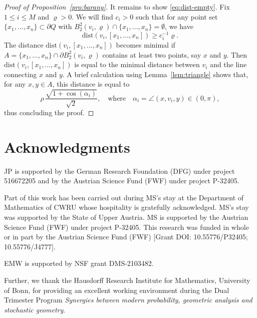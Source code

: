 \documentclass[a4paper,12pt]{article}
\theoremstyle{definition}
\newcommand{\dist}{\mathrm{dist}}
\begin{document}
\begin{proof}[Proof of Proposition~\ref{pro:barany}]
It remains to show \eqref{eq:dist-empty}. Fix $1\le i\le M$ and $\varrho>0$. We will find $c_i>0$ such that for any point set $\{x_1,\dots,x_n\}\subset \partial Q$ with $B^2_2(v_i,\varrho)\cap \{x_1,\dots,x_n\}=\emptyset$, we have 
\[
\dist(v_i,[x_1,\dots,x_n])\ge c_i^{-1}\varrho.
\]
The distance $\dist(v_i,[x_1,\dots,x_n])$ becomes minimal if $A=\{x_1,\dots,x_n\}\cap \partial B^2_2(v_i,\varrho)$ contains at least two points, say $x$ and $y$. Then $\dist(v_i,[x_1,\dots,x_n])$ is equal to the minimal distance between $v_i$ and the line connecting $x$ and $y$. A brief calculation using Lemma~\ref{lem:triangle} shows that, for any $x,y\in A$, this distance is equal to 
\begin{equation} \label{eq:height-2}
	\rho \, \frac{\sqrt{1+\cos(\alpha_i)}}{\sqrt{2}},\quad\text{where}\quad\alpha_i=\angle(x,v_i,y)\in (0,\pi),
\end{equation}
thus concluding the proof.
\end{proof}




\section*{Acknowledgments}

JP is supported by the German Research Foundation (DFG) under project 516672205 and by the Austrian Science Fund (FWF) under project P-32405.

\par
\noindent
Part of this work has been carried out during MS's stay at the Department of Mathematics of CWRU whose hospitality is gratefully acknowledged.  MS's stay was supported by the State of Upper Austria.  MS is supported by the Austrian Science Fund (FWF) under project P-32405. This research was funded in whole or in part by the Austrian Science Fund (FWF) [Grant DOI: 10.55776/P32405; 10.55776/J4777]. 
\par
\noindent
EMW is  supported by NSF grant DMS-2103482.
\par
\noindent
Further, we thank the Hausdorff Research Institute for Mathematics, University of Bonn, for providing an excellent  working environment during the Dual Trimester Program \emph{Synergies between modern probability, geometric analysis and stochastic geometry}.




\end{document}
